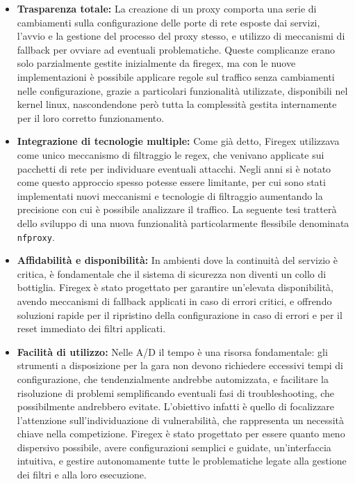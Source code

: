 \begin{itemize}
    \setlength{\itemsep}{1pt}
    \setlength{\parskip}{1pt}
    \item \textbf{Trasparenza totale:} La creazione di un proxy comporta una serie di cambiamenti sulla configurazione delle porte di rete esposte dai servizi, l'avvio e la gestione del processo del proxy stesso, e utilizzo di meccanismi di fallback per ovviare ad eventuali problematiche. Queste complicanze erano solo parzialmente gestite inizialmente da firegex, ma con le nuove implementazioni è possibile applicare regole sul traffico senza cambiamenti nelle configurazione, grazie a particolari funzionalità utilizzate, disponibili nel kernel linux, nascondendone però tutta la complessità gestita internamente per il loro corretto funzionamento.
    \item \textbf{Integrazione di tecnologie multiple:} Come già detto, Firegex utilizzava come unico meccanismo di filtraggio le regex, che venivano applicate sui pacchetti di rete per individuare eventuali attacchi. Negli anni si è notato come questo approccio spesso potesse essere limitante, per cui sono stati implementati nuovi meccanismi e tecnologie di filtraggio aumentando la precisione con cui è possibile analizzare il traffico. La seguente tesi tratterà dello sviluppo di una nuova funzionalità particolarmente flessibile denominata \texttt{nfproxy}.
    \item \textbf{Affidabilità e disponibilità:} In ambienti dove la continuità del servizio è critica, è fondamentale che il sistema di sicurezza non diventi un collo di bottiglia. Firegex è stato progettato per garantire un’elevata disponibilità, avendo meccanismi di fallback applicati in caso di errori critici, e offrendo soluzioni rapide per il ripristino della configurazione in caso di errori e per il reset immediato dei filtri applicati.
    \item \textbf{Facilità di utilizzo:} Nelle A/D il tempo è una risorsa fondamentale: gli strumenti a disposizione per la gara non devono richiedere eccessivi tempi di configurazione, che tendenzialmente andrebbe automizzata, e facilitare la risoluzione di problemi semplificando eventuali fasi di troubleshooting, che possibilmente andrebbero evitate. L'obiettivo infatti è quello di focalizzare l'attenzione sull'individuazione di vulnerabilità, che rappresenta un necessità chiave nella competizione. Firegex è stato progettato per essere quanto meno dispersivo possibile, avere configurazioni semplici e guidate, un'interfaccia intuitiva, e gestire autonomamente tutte le problematiche legate alla gestione dei filtri e alla loro esecuzione.
\end{itemize}

